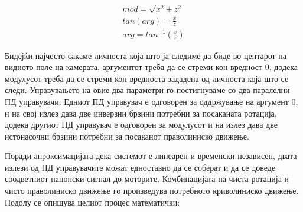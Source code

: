 \documentclass[12pt]{article}
\begin{document}

      \begin{equation} \label{eq:cart2pol}
        \begin{aligned}
    	  mod = \sqrt{x^{2} + z^{2}} \\
        tan(arg) = \frac{x}{z} \\
        arg = tan^{-1}(\frac{x}{z})
        \end{aligned}
        \end{equation}

      Бидејќи најчесто сакаме личноста која што ја следиме да биде во центарот на видното поле на камерата, аргументот треба да се стреми кон вредност 0, додека модулусот треба да се стреми кон вредноста зададена од личноста која што се следи. Управувањето на овие два параметри го постигнуваме со два паралелни ПД управувачи. Едниот ПД управувач е одговорен за оддржување на аргумент 0, и на свој излез дава две инверзни брзини потребни за посаканата ротација, додека другиот ПД управувач е одговорен за модулусот и на излез дава две истонасочни брзини потребни за посаканот праволиниско движење.

      Поради апроксимацијата дека системот е линеарен и временски независен, двата излези од ПД управувачите можат едноставно да се соберат и да се доведе соодветниот напонски сигнал до моторите. Комбинацијата на чиста ротација и чисто праволиниско движење го произведува потребното криволиниско движење. Подолу се опишува целиот процес математички:
\end{document}
